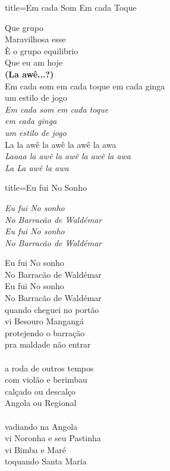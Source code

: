 \documentclass[fontsize=14pt, paper=a4, twoside, DIV=20]{scrreprt} %
\begin{document}
\begin{multicols*}{2}
\begin{song}{title={Em cada Som Em cada Toque}}
\begin{verse*}
            Que grupo\\
            Maravilhosa esse\\
            È o grupo equilibrio\\
            Que eu am hoje\\
            \textbf{(La awê...?)}\\
            Em cada som em cada toque em cada ginga\\
            um estilo de jogo\\
            \textit{Em cada som em cada toque\\
            em cada ginga}\\
            \textit{um estilo de jogo}\\
            La la awê la awê la awê la awa\\
            \textit{Laaaa la awê la awê la awê la awa}\\
            \textit{La La awê la awa}\\
        \end{verse*}
\end{song}

\begin{song}{title={Eu fui No Sonho}}
    \begin{chorus*}
            \textit{Eu fui No sonho\\
            No Barracão de Waldémar\\
            Eu fui No sonho\\
            No Barracão de Waldémar\\}
    \end{chorus*}
    \begin{verse*}

            Eu fui No sonho\\
            No Barracão de Waldémar\\
            Eu fui No sonho\\
            No Barracão de Waldémar\\

            quando cheguei no portão\\
            vi Besouro Mangangá\\
            protejendo o barração\\
            pra maldade não entrar\\
\\
            a roda de outros tempos\\
            com violão e berimbau\\
            calçado ou descalço\\
            Angola ou Regional\\
\\
            vadiando na Angola\\
            vi Noronha e seu Pastinha\\
            vi Bimba e Maré\\
            toquando Santa Maria\\


\end{verse*}
\end{song}
\end{multicols*}
\end{document}
